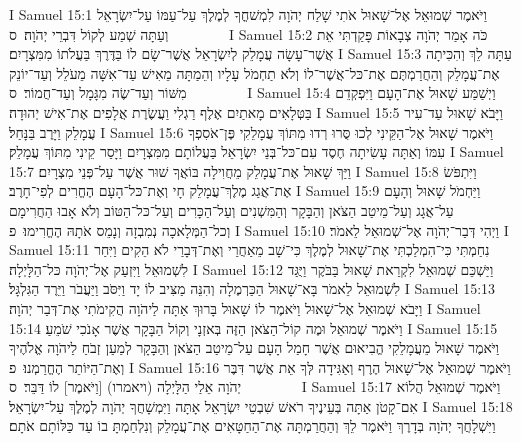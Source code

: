 I Samuel 15:1	וַיֹּאמֶר שְׁמוּאֵל אֶל־שָׁאוּל אֹתִי שָׁלַח יְהֹוָה לִמְשׁחֳךָ לְמֶלֶךְ עַל־עַמּוֹ עַל־יִשְׂרָאֵל וְעַתָּה שְׁמַע לְקוֹל דִּבְרֵי יְהֹוָה׃ {ס}        
I Samuel 15:2	כֹּה אָמַר יְהֹוָה צְבָאוֹת פָּקַדְתִּי אֵת אֲשֶׁר־עָשָׂה עֲמָלֵק לְיִשְׂרָאֵל אֲשֶׁר־שָׂם לוֹ בַּדֶּרֶךְ בַּעֲלֹתוֹ מִמִּצְרָיִם׃
I Samuel 15:3	עַתָּה לֵךְ וְהִכִּיתָה אֶת־עֲמָלֵק וְהַחֲרַמְתֶּם אֶת־כּל־אֲשֶׁר־לוֹ וְלֹא תַחְמֹל עָלָיו וְהֵמַתָּה מֵאִישׁ עַד־אִשָּׁה מֵעֹלֵל וְעַד־יוֹנֵק מִשּׁוֹר וְעַד־שֶׂה מִגָּמָל וְעַד־חֲמוֹר׃ {ס}        
I Samuel 15:4	וַיְשַׁמַּע שָׁאוּל אֶת־הָעָם וַיִּפְקְדֵם בַּטְּלָאִים מָאתַיִם אֶלֶף רַגְלִי וַעֲשֶׂרֶת אֲלָפִים אֶת־אִישׁ יְהוּדָה׃
I Samuel 15:5	וַיָּבֹא שָׁאוּל עַד־עִיר עֲמָלֵק וַיָּרֶב בַּנָּחַל׃
I Samuel 15:6	וַיֹּאמֶר שָׁאוּל אֶל־הַקֵּינִי לְכוּ סֻּרוּ רְדוּ מִתּוֹךְ עֲמָלֵקִי פֶּן־אֹסִפְךָ עִמּוֹ וְאַתָּה עָשִׂיתָה חֶסֶד עִם־כּל־בְּנֵי יִשְׂרָאֵל בַּעֲלוֹתָם מִמִּצְרָיִם וַיָּסַר קֵינִי מִתּוֹךְ עֲמָלֵק׃
I Samuel 15:7	וַיַּךְ שָׁאוּל אֶת־עֲמָלֵק מֵחֲוִילָה בּוֹאֲךָ שׁוּר אֲשֶׁר עַל־פְּנֵי מִצְרָיִם׃
I Samuel 15:8	וַיִּתְפֹּשׂ אֶת־אֲגַג מֶלֶךְ־עֲמָלֵק חָי וְאֶת־כּל־הָעָם הֶחֱרִים לְפִי־חָרֶב׃
I Samuel 15:9	וַיַּחְמֹל שָׁאוּל וְהָעָם עַל־אֲגָג וְעַל־מֵיטַב הַצֹּאן וְהַבָּקָר וְהַמִּשְׁנִים וְעַל־הַכָּרִים וְעַל־כּל־הַטּוֹב וְלֹא אָבוּ הַחֲרִימָם וְכל־הַמְּלָאכָה נְמִבְזָה וְנָמֵס אֹתָהּ הֶחֱרִימוּ׃ {פ}
I Samuel 15:10	וַיְהִי דְּבַר־יְהֹוָה אֶל־שְׁמוּאֵל לֵאמֹר׃
I Samuel 15:11	נִחַמְתִּי כִּי־הִמְלַכְתִּי אֶת־שָׁאוּל לְמֶלֶךְ כִּי־שָׁב מֵאַחֲרַי וְאֶת־דְּבָרַי לֹא הֵקִים וַיִּחַר לִשְׁמוּאֵל וַיִּזְעַק אֶל־יְהֹוָה כּל־הַלָּיְלָה׃
I Samuel 15:12	וַיַּשְׁכֵּם שְׁמוּאֵל לִקְרַאת שָׁאוּל בַּבֹּקֶר וַיֻּגַּד לִשְׁמוּאֵל לֵאמֹר בָּא־שָׁאוּל הַכַּרְמֶלָה וְהִנֵּה מַצִּיב לוֹ יָד וַיִּסֹּב וַיַּעֲבֹר וַיֵּרֶד הַגִּלְגָּל׃
I Samuel 15:13	וַיָּבֹא שְׁמוּאֵל אֶל־שָׁאוּל וַיֹּאמֶר לוֹ שָׁאוּל בָּרוּךְ אַתָּה לַיהֹוָה הֲקִימֹתִי אֶת־דְּבַר יְהֹוָה׃
I Samuel 15:14	וַיֹּאמֶר שְׁמוּאֵל וּמֶה קוֹל־הַצֹּאן הַזֶּה בְּאזְנָי וְקוֹל הַבָּקָר אֲשֶׁר אָנֹכִי שֹׁמֵעַ׃
I Samuel 15:15	וַיֹּאמֶר שָׁאוּל מֵעֲמָלֵקִי הֱבִיאוּם אֲשֶׁר חָמַל הָעָם עַל־מֵיטַב הַצֹּאן וְהַבָּקָר לְמַעַן זְבֹחַ לַיהֹוָה אֱלֹהֶיךָ וְאֶת־הַיּוֹתֵר הֶחֱרַמְנוּ׃ {פ}
I Samuel 15:16	וַיֹּאמֶר שְׁמוּאֵל אֶל־שָׁאוּל הֶרֶף וְאַגִּידָה לְּךָ אֵת אֲשֶׁר דִּבֶּר יְהֹוָה אֵלַי הַלָּיְלָה (ויאמרו) [וַיֹּאמֶר] לוֹ דַּבֵּר׃ {ס}        
I Samuel 15:17	וַיֹּאמֶר שְׁמוּאֵל הֲלוֹא אִם־קָטֹן אַתָּה בְּעֵינֶיךָ רֹאשׁ שִׁבְטֵי יִשְׂרָאֵל אָתָּה וַיִּמְשָׁחֲךָ יְהֹוָה לְמֶלֶךְ עַל־יִשְׂרָאֵל׃
I Samuel 15:18	וַיִּשְׁלָחֲךָ יְהֹוָה בְּדָרֶךְ וַיֹּאמֶר לֵךְ וְהַחֲרַמְתָּה אֶת־הַחַטָּאִים אֶת־עֲמָלֵק וְנִלְחַמְתָּ בוֹ עַד כַּלּוֹתָם אֹתָם׃
